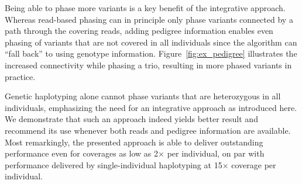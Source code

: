Being able to phase more variants is a key benefit of the integrative approach.
Whereas read-based phasing can in principle only phase variants connected by a path through the covering reads, adding pedigree information enables even phasing of variants that are not covered in all individuals since the algorithm can ``fall back'' to using genotype information.
Figure~\ref{fig:ex_pedigree} illustrates the increased connectivity while phasing a trio, resulting in more phased variants in practice.

Genetic haplotyping alone cannot phase variants that are heterozygous in all individuals, emphasizing the need for an integrative approach as introduced here.
We demonstrate that such an approach indeed yields better result and recommend its use whenever both reads and pedigree information are available.
Most remarkingly, the presented approach is able to deliver outstanding performance even for coverages as low as 2$\times$ per individual, on par with performance delivered by single-individual haplotyping at 15$\times$ coverage per individual.

% 






